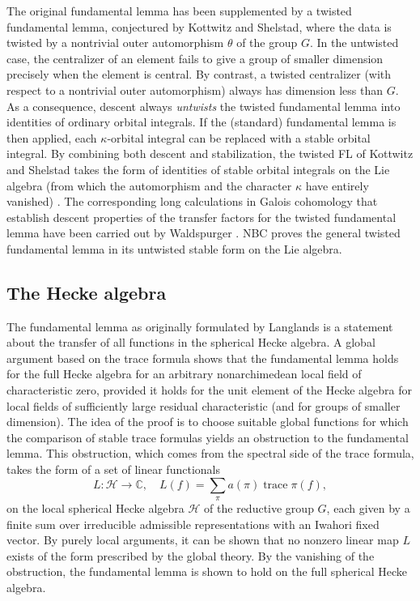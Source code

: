 \documentclass[brochure,english,12pt]{bourbaki}
\def\op#1{{\operatorname{#1}}}
\newcommand{\ring}[1]{\mathbb{#1}}
\begin{document}
The original fundamental lemma has been supplemented by a twisted
fundamental lemma, conjectured by Kottwitz and Shelstad, where the
data is twisted by a nontrivial outer automorphism $\theta$ of the
group $G$.  In the untwisted case, the centralizer of an element fails
to give a group of smaller dimension precisely when the element is
central.  By contrast, a twisted centralizer (with respect to a
nontrivial outer automorphism) always has dimension less than $G$.  As
a consequence, descent always {\it untwists} the twisted fundamental
lemma into identities of ordinary orbital integrals.  If the
(standard) fundamental lemma is then applied, each $\kappa$-orbital
integral can be replaced with a stable orbital integral.  By combining both
descent and stabilization, the twisted FL of Kottwitz and Shelstad
takes the form of identities of stable orbital integrals on the Lie
algebra (from which the automorphism and the character $\kappa$ have
entirely vanished) \cite{twisted-h}.  The corresponding long calculations in Galois
cohomology that establish descent properties of the transfer factors
for the twisted fundamental lemma have been carried out by
Waldspurger \cite{twisted-w}.  NBC proves the general twisted fundamental lemma in
its untwisted stable form on the Lie algebra.



\subsection{The Hecke algebra}

The fundamental lemma as originally formulated by Langlands
is a statement about the transfer of all
functions in the spherical Hecke algebra.  A global argument based on
the trace formula shows that the fundamental lemma holds for the full
Hecke algebra for an arbitrary nonarchimedean local field of
characteristic zero, provided it holds for the unit element of the
Hecke algebra for local fields of sufficiently large residual
characteristic (and for groups of smaller dimension).  
The idea of the proof is to choose suitable global
functions for which the comparison of stable trace formulas yields an
obstruction to the fundamental lemma.  This obstruction, which comes from the
spectral side of the trace formula, takes the form
of a set of linear functionals  
\[
L:{\mathcal H}\to\ring{C},\quad L(f) = \sum_\pi a(\pi) \op{trace}\pi(f),
\]
on the local spherical Hecke
algebra ${\mathcal H}$ of the reductive group $G$, each given by a finite sum over
irreducible admissible representations with an Iwahori fixed vector.
By purely local arguments, it
can be shown that no nonzero linear map $L$ exists of the form
prescribed by the global theory. 
By the vanishing of the obstruction,
the fundamental lemma is shown to hold on the full spherical Hecke algebra.
\end{document}
